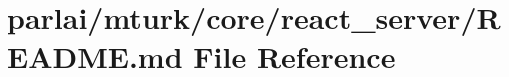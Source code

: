 \hypertarget{parlai_2mturk_2core_2react__server_2README_8md}{}\section{parlai/mturk/core/react\+\_\+server/\+R\+E\+A\+D\+ME.md File Reference}
\label{parlai_2mturk_2core_2react__server_2README_8md}
